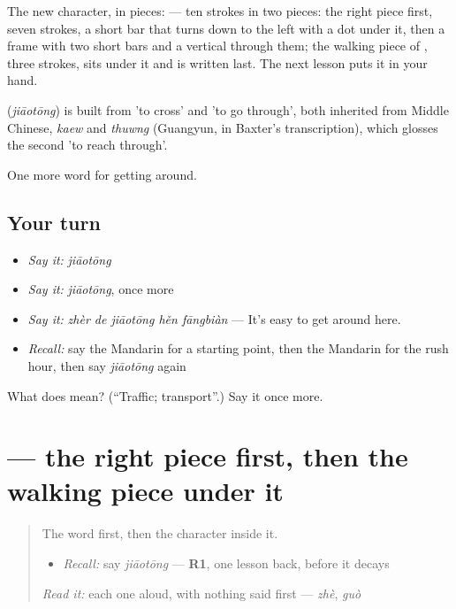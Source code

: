 The new character, in pieces:  — ten strokes in two pieces: the right piece first, seven strokes, a short bar that turns down to the left with a dot under it, then a frame with two short bars and a vertical through them; the walking piece of , three strokes, sits under it and is written last. The next lesson puts it in your hand.

\begin{cousinweb}
\textbf{} (\emph{jiāotōng}) is built from  'to cross' and  'to go through', both inherited from Middle Chinese, \emph{kaew} and \emph{thuwng} (Guangyun, in Baxter's transcription), which glosses the second 'to reach through'.
\end{cousinweb}

\begin{grammarlens}[title={What you've built}]
One more word for getting around.
\end{grammarlens}

\subsection*{Your turn}
\begin{itemize}
\raggedright
  \item \emph{Say it:} \emph{jiāotōng}
  \item \emph{Say it:} \emph{jiāotōng}, once more
  \item \emph{Say it:} \emph{zhèr de jiāotōng hěn fāngbiàn} — It's easy to get around here.
  \item \emph{Recall:} say the Mandarin for a starting point, then the Mandarin for the rush hour, then say \emph{jiāotōng} again
\end{itemize}

\begin{tcolorbox}[breakable,colback=teal!4,colframe=teal!35!black,title={Before you move on}]
What does  mean? (\textquotedblleft{}Traffic; transport\textquotedblright{}.) Say it once more.
\end{tcolorbox}
\section[\texorpdfstring{\zh{通} (tōng)}{通 (tōng)}]{ — the right piece first, then the walking piece under it}

\label{lesson:ZH-W409-tong-through}



\begin{quote}
The word first, then the character inside it.

\begin{itemize}
\raggedright
  \item \emph{Recall:} say \emph{jiāotōng} — \textbf{R1}, one lesson back, before it decays
\end{itemize}

\begin{quote}
 
\end{quote}

\emph{Read it:} each one aloud, with nothing said first — \emph{zhè}, \emph{guò}
\end{quote}

